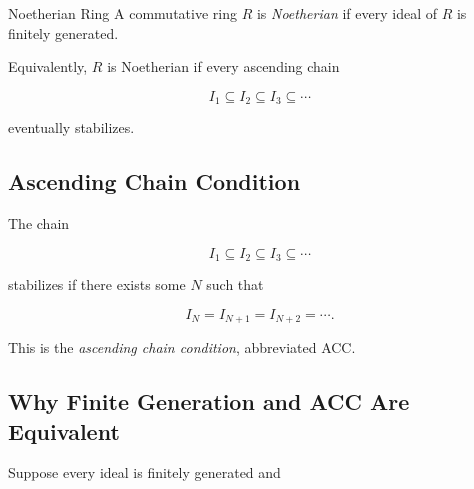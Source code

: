 \begin{definitionbox}{Noetherian Ring}
A commutative ring \(R\) is \emph{Noetherian} if every ideal of \(R\) is
finitely generated.
\end{definitionbox}

Equivalently, \(R\) is Noetherian if every ascending chain

\[ I_1\subseteq I_2\subseteq I_3\subseteq\cdots \]

eventually stabilizes.

\subsection{Ascending Chain Condition}
\label{subsec:acc-ideals}

The chain

\[ I_1\subseteq I_2\subseteq I_3\subseteq\cdots \]

stabilizes if there exists some \(N\) such that

\[ I_N=I_{N+1}=I_{N+2}=\cdots. \]

\begin{center}
\end{center}

This is the \emph{ascending chain condition}, abbreviated ACC.

\subsection{Why Finite Generation and ACC Are Equivalent}
\label{subsec:noetherian-equivalence}

Suppose every ideal is finitely generated and

